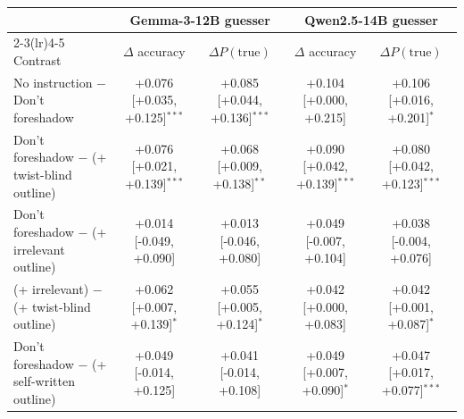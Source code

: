 \begin{tabular}{lcccc}
\toprule
 & \multicolumn{2}{c}{Gemma-3-12B guesser} & \multicolumn{2}{c}{Qwen2.5-14B guesser} \\
\cmidrule(lr){2-3}\cmidrule(lr){4-5}
Contrast & $\Delta$ accuracy & $\Delta P(\text{true})$ & $\Delta$ accuracy & $\Delta P(\text{true})$ \\
\midrule
No instruction $-$ Don't foreshadow & +0.076 [+0.035, +0.125]$^{***}$ & +0.085 [+0.044, +0.136]$^{***}$ & +0.104 [+0.000, +0.215] & +0.106 [+0.016, +0.201]$^{*}$ \\
Don't foreshadow $-$ (+ twist-blind outline) & +0.076 [+0.021, +0.139]$^{***}$ & +0.068 [+0.009, +0.138]$^{**}$ & +0.090 [+0.042, +0.139]$^{***}$ & +0.080 [+0.042, +0.123]$^{***}$ \\
Don't foreshadow $-$ (+ irrelevant outline) & +0.014 [-0.049, +0.090] & +0.013 [-0.046, +0.080] & +0.049 [-0.007, +0.104] & +0.038 [-0.004, +0.076] \\
(+ irrelevant) $-$ (+ twist-blind outline) & +0.062 [+0.007, +0.139]$^{*}$ & +0.055 [+0.005, +0.124]$^{*}$ & +0.042 [+0.000, +0.083] & +0.042 [+0.001, +0.087]$^{*}$ \\
Don't foreshadow $-$ (+ self-written outline) & +0.049 [-0.014, +0.125] & +0.041 [-0.014, +0.108] & +0.049 [+0.007, +0.090]$^{*}$ & +0.047 [+0.017, +0.077]$^{***}$ \\
\bottomrule
\end{tabular}
